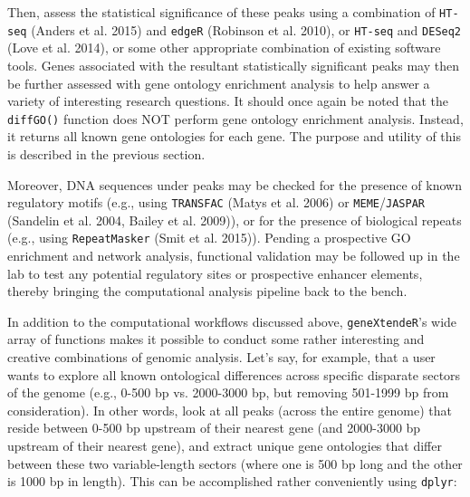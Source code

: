 \documentclass[12pt]{article}
\begin{document}
Then, assess the statistical significance of these peaks using a combination of \texttt{HT-seq} (Anders et al. 2015) and \texttt{edgeR} (Robinson et al. 2010), or \texttt{HT-seq} and \texttt{DESeq2} (Love et al. 2014), or some other appropriate combination of existing software tools.  Genes associated with the resultant statistically significant peaks may then be further assessed with gene ontology enrichment analysis to help answer a variety of interesting research questions.  It should once again be noted that the \texttt{diffGO()} function does NOT perform gene ontology enrichment analysis.  Instead, it returns all known gene ontologies for each gene.  The purpose and utility of this is described in the previous section.

Moreover, DNA sequences under peaks may be checked for the presence of known regulatory motifs (e.g., using \texttt{TRANSFAC} (Matys et al. 2006) or \texttt{MEME}/\texttt{JASPAR} (Sandelin et al. 2004, Bailey et al. 2009)), or for the presence of biological repeats (e.g., using \texttt{RepeatMasker} (Smit et al. 2015)). Pending a prospective GO enrichment and network analysis, functional validation may be followed up in the lab to test any potential regulatory sites or prospective enhancer elements, thereby bringing the computational analysis pipeline back to the bench.

In addition to the computational workflows discussed above, \texttt{geneXtendeR}'s wide array of functions makes it possible to conduct some rather interesting and creative combinations of genomic analysis.  Let's say, for example, that a user wants to explore all known ontological differences across specific disparate sectors of the genome (e.g., 0-500 bp vs. 2000-3000 bp, but removing 501-1999 bp from consideration).  In other words, look at all peaks (across the entire genome) that reside between 0-500 bp upstream of their nearest gene (and 2000-3000 bp upstream of their nearest gene), and extract unique gene ontologies that differ between these two variable-length sectors (where one is 500 bp long and the other is 1000 bp in length).  This can be accomplished rather conveniently using \texttt{dplyr}:
\end{document}
